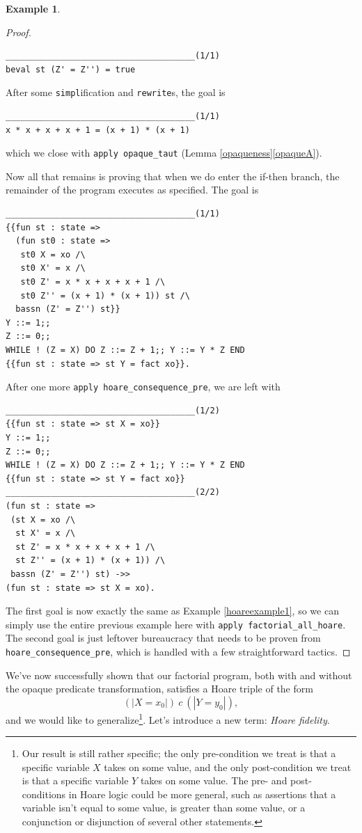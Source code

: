 \documentclass[12pt,notitlepage]{report}
\theoremstyle{plain}
\theoremstyle{definition}
\newtheorem{example}[theo]{Example}
\newcommand{\define}[1]{\emph{#1}\index{#1}}
\numberwithin{equation}{section}
\begin{document}
\begin{example}
\begin{proof}
\begin{verbatim}
______________________________________(1/1)
beval st (Z' = Z'') = true
\end{verbatim}
After some \verb$simpl$ification and \verb$rewrite$s, the goal is
\begin{verbatim}
______________________________________(1/1)
x * x + x + x + 1 = (x + 1) * (x + 1)
\end{verbatim}
which we close with \verb$apply opaque_taut$ (Lemma \ref{opaqueness}\eqref{opaqueA}).
\par Now all that remains is proving that when we do enter the if-then branch, the remainder of the program executes as specified.  The goal is
\begin{verbatim}
______________________________________(1/1)
{{fun st : state =>
  (fun st0 : state =>
   st0 X = xo /\
   st0 X' = x /\
   st0 Z' = x * x + x + x + 1 /\
   st0 Z'' = (x + 1) * (x + 1)) st /\
  bassn (Z' = Z'') st}}
Y ::= 1;;
Z ::= 0;;
WHILE ! (Z = X) DO Z ::= Z + 1;; Y ::= Y * Z END
{{fun st : state => st Y = fact xo}}.
\end{verbatim}
After one more \verb$apply hoare_consequence_pre$, we are left with
\begin{verbatim}
______________________________________(1/2)
{{fun st : state => st X = xo}}
Y ::= 1;;
Z ::= 0;;
WHILE ! (Z = X) DO Z ::= Z + 1;; Y ::= Y * Z END
{{fun st : state => st Y = fact xo}}
______________________________________(2/2)
(fun st : state =>
 (st X = xo /\
  st X' = x /\
  st Z' = x * x + x + x + 1 /\
  st Z'' = (x + 1) * (x + 1)) /\
 bassn (Z' = Z'') st) ->>
(fun st : state => st X = xo).
\end{verbatim}
The first goal is now exactly the same as Example \ref{hoareexample1}, so we can simply use the entire previous example here with \verb$apply factorial_all_hoare$.  The second goal is just leftover bureaucracy that needs to be proven from \verb$hoare_consequence_pre$, which is handled with a few straightforward tactics.
\end{proof}
\end{example}

We've now successfully shown that our factorial program, both with and without the opaque predicate transformation, satisfies a Hoare triple of the form
\[ (| X = x_0 |)\ c\ (| Y = y_0 |), \]
and we would like to generalize\footnote{Our result is still rather specific; the only pre-condition we treat is that a specific variable $X$ takes on some value, and the only post-condition we treat is that a specific variable $Y$ takes on some value.  The pre- and post- conditions in Hoare logic could be more general, such as assertions that a variable isn't equal to some value, is greater than some value, or a conjunction or disjunction of several other statements.}.  Let's introduce a new term: \define{Hoare fidelity}.
\end{document}
